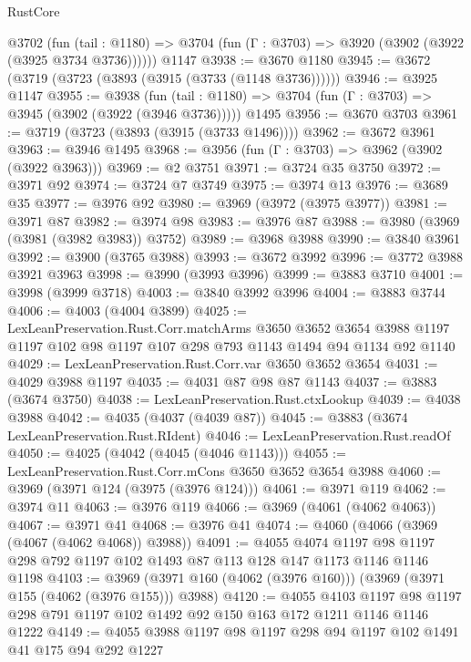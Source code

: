 \begin{lexlean}{RustCore}
\begin{coremodule}
    @3702
      (fun (tail : @1180) => @3704 (fun (Γ : @3703) => @3920 (@3902 (@3922 (@3925 @3734 @3736))))))
    @1147
@3938 := @3670 @1180
@3945 := @3672 (@3719 (@3723 (@3893 (@3915 (@3733 (@1148 @3736))))))
@3946 := @3925 @1147
@3955 := @3938
    (fun (tail : @1180) => @3704 (fun (Γ : @3703) => @3945 (@3902 (@3922 (@3946 @3736)))))
    @1495
@3956 := @3670 @3703
@3961 := @3719 (@3723 (@3893 (@3915 (@3733 @1496))))
@3962 := @3672 @3961
@3963 := @3946 @1495
@3968 := @3956 (fun (Γ : @3703) => @3962 (@3902 (@3922 @3963)))
@3969 := @2 @3751
@3971 := @3724 @35 @3750
@3972 := @3971 @92
@3974 := @3724 @7 @3749
@3975 := @3974 @13
@3976 := @3689 @35
@3977 := @3976 @92
@3980 := @3969 (@3972 (@3975 @3977))
@3981 := @3971 @87
@3982 := @3974 @98
@3983 := @3976 @87
@3988 := @3980 (@3969 (@3981 (@3982 @3983)) @3752)
@3989 := @3968 @3988
@3990 := @3840 @3961
@3992 := @3900 (@3765 @3988)
@3993 := @3672 @3992
@3996 := @3772 @3988 @3921 @3963
@3998 := @3990 (@3993 @3996)
@3999 := @3883 @3710
@4001 := @3998 (@3999 @3718)
@4003 := @3840 @3992 @3996
@4004 := @3883 @3744
@4006 := @4003 (@4004 @3899)
@4025 := LexLeanPreservation.Rust.Corr.matchArms
    @3650
    @3652
    @3654
    @3988
    @1197
    @1197
    @102
    @98
    @1197
    @107
    @298
    @793
    @1143
    @1494
    @94
    @1134
    @92
    @1140
@4029 := LexLeanPreservation.Rust.Corr.var @3650 @3652 @3654
@4031 := @4029 @3988 @1197
@4035 := @4031 @87 @98 @87 @1143
@4037 := @3883 (@3674 @3750)
@4038 := LexLeanPreservation.Rust.ctxLookup
@4039 := @4038 @3988
@4042 := @4035 (@4037 (@4039 @87))
@4045 := @3883 (@3674 LexLeanPreservation.Rust.RIdent)
@4046 := LexLeanPreservation.Rust.readOf
@4050 := @4025 (@4042 (@4045 (@4046 @1143)))
@4055 := LexLeanPreservation.Rust.Corr.mCons @3650 @3652 @3654 @3988
@4060 := @3969 (@3971 @124 (@3975 (@3976 @124)))
@4061 := @3971 @119
@4062 := @3974 @11
@4063 := @3976 @119
@4066 := @3969 (@4061 (@4062 @4063))
@4067 := @3971 @41
@4068 := @3976 @41
@4074 := @4060 (@4066 (@3969 (@4067 (@4062 @4068)) @3988))
@4091 := @4055
    @4074
    @1197
    @98
    @1197
    @298
    @792
    @1197
    @102
    @1493
    @87
    @113
    @128
    @147
    @1173
    @1146
    @1146
    @1198
@4103 := @3969 (@3971 @160 (@4062 (@3976 @160))) (@3969 (@3971 @155 (@4062 (@3976 @155))) @3988)
@4120 := @4055
    @4103
    @1197
    @98
    @1197
    @298
    @791
    @1197
    @102
    @1492
    @92
    @150
    @163
    @172
    @1211
    @1146
    @1146
    @1222
@4149 := @4055
    @3988
    @1197
    @98
    @1197
    @298
    @94
    @1197
    @102
    @1491
    @41
    @175
    @94
    @292
    @1227

\end{coremodule}
\end{lexlean}

